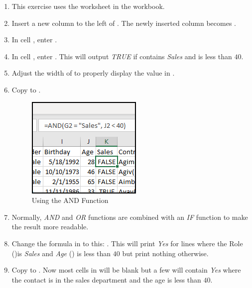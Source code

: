 \begin{enumbox}
	\begin{enumerate}
		\item This exercise uses the  worksheet in the  workbook.
		\item Insert a new column to the left of . The newly inserted column becomes .
		\item In cell , enter .
		\item In cell , enter . This will output \textit{TRUE} if  contains \textit{Sales} and  is less than $ 40 $. 
		\item Adjust the width of  to properly display the value in .
		\item Copy  to .
		
		\begin{figure}[H]
			\centering
			\includegraphics[width=\maxwidth{.50\linewidth}]{gfx/ch09_fig47}
			\caption{Using the AND Function}
			\label{09:fig47}
		\end{figure}
	
		\item Normally, \textit{AND} and \textit{OR} functions are combined with an \textit{IF} function to make the result more readable.
		\item Change the formula in  to this: . This will print \textit{Yes} for lines where the Role ()is \textit{Sales} and \textit{Age} () is less than $ 40 $ but print nothing otherwise. 
		\item Copy  to . Now most cells in  will be blank but a few will contain \textit{Yes} where the contact is in the sales department and the age is less than $ 40 $.
	\end{enumerate}
\end{enumbox}
	
